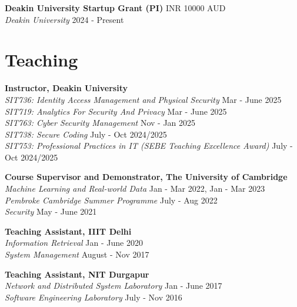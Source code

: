\documentclass[margin, centered,lmodern]{res}
\begin{document}
\begin{resume}
\textbf{Deakin University Startup Grant (PI)} \hfill INR 10000 AUD  \\
\emph{Deakin University} \hfill 2024 - Present

\section{Teaching}
\textbf{Instructor,  Deakin University} \\
\emph{SIT736: Identity Access Management and Physical Security} \hfill Mar - June 2025 \\
\emph{SIT719: Analytics For Security And Privacy} \hfill Mar - June 2025 \\
\emph{SIT763: Cyber Security Management} \hfill Nov - Jan 2025 \\
\emph{SIT738: Secure Coding} \hfill July - Oct 2024/2025 \\
\emph{SIT753: Professional Practices in IT (SEBE Teaching Excellence Award)} \hfill July - Oct 2024/2025 

\textbf{Course Supervisor and Demonstrator, The University of Cambridge} \\
\emph{Machine Learning and Real-world Data} \hfill Jan - Mar 2022, Jan - Mar 2023 \\
\emph{Pembroke Cambridge Summer Programme} \hfill July - Aug 2022 \\
\emph{Security} \hfill May - June 2021 

\textbf{Teaching Assistant, IIIT Delhi} \\
\emph{Information Retrieval} \hfill Jan - June 2020 \\
\emph{System Management} \hfill August - Nov 2017


\textbf{Teaching Assistant, NIT Durgapur} \\
\emph{Network and Distributed System Laboratory} \hfill Jan - June 2017 \\
\emph{Software Engineering Laboratory} \hfill July - Nov 2016



\end{resume}
\end{document}
